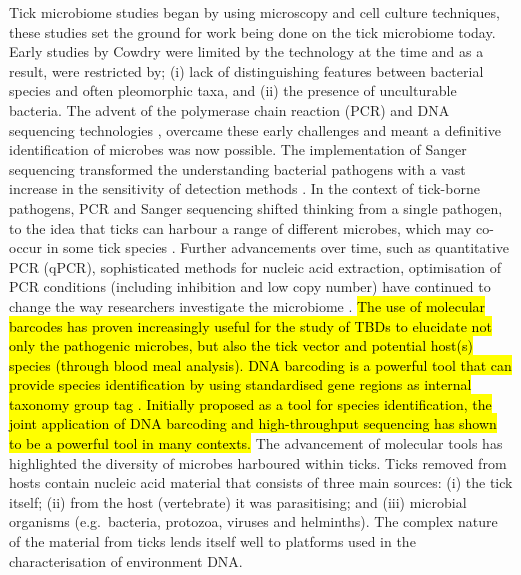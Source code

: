 \documentclass[a4paper, nobind]{templates/ociamthesis}
\begin{document}
Tick microbiome studies began by using microscopy and cell culture techniques, these studies set the ground for work being done on the tick microbiome today.
Early studies by Cowdry \autocite*{cowdryGroupMicroorganismsTransmitted1925} were limited by the technology at the time and as a result, were restricted by; (i) lack of distinguishing features between bacterial species and often pleomorphic taxa, and (ii) the presence of unculturable bacteria.
The advent of the polymerase chain reaction (PCR) \autocite{mullisSpecificSynthesisDNA1987} and DNA sequencing technologies \autocite{sangerDNASequencingChaintermination1977}, overcame these early challenges and meant a definitive identification of microbes was now possible.
The implementation of Sanger sequencing transformed the understanding bacterial pathogens with a vast increase in the sensitivity of detection methods \autocite{chakravortyDetailedAnalysis16S2007,macdonaldFrameworkDevelopingValidating2016}.
In the context of tick-borne pathogens, PCR and Sanger sequencing shifted thinking from a single pathogen, to the idea that ticks can harbour a range of different microbes, which may co-occur in some tick species \autocite{brouquiGuidelinesDiagnosisTickborne2004,scolesPhylogeneticAnalysisFrancisellalike2004,parolaTickFleaborneRickettsial2005}.
Further advancements over time, such as quantitative PCR (qPCR), sophisticated methods for nucleic acid extraction, optimisation of PCR conditions (including inhibition and low copy number) have continued to change the way researchers investigate the microbiome \autocite{hoffmannAnalysisTickSurface2020,koloAnaplasmaPhagocytophilumOther2020}.
\hl{The use of molecular barcodes has proven increasingly useful for the study of TBDs to elucidate not only the pathogenic microbes, but also the tick vector and potential host(s) species (through blood meal analysis). DNA barcoding is a powerful tool that can provide species identification by using standardised gene regions as internal taxonomy group tag \autocite{hubertDNABarcodingSpecies2015}. Initially proposed as a tool for species identification, the joint application of DNA barcoding and high-throughput sequencing has shown to be a powerful tool in many contexts.}
The advancement of molecular tools has highlighted the diversity of microbes harboured within ticks.
Ticks removed from hosts contain nucleic acid material that consists of three main sources: (i) the tick itself; (ii) from the host (vertebrate) it was parasitising; and (iii) microbial organisms (e.g.~bacteria, protozoa, viruses and helminths).
The complex nature of the material from ticks lends itself well to platforms used in the characterisation of environment DNA.
\end{document}
